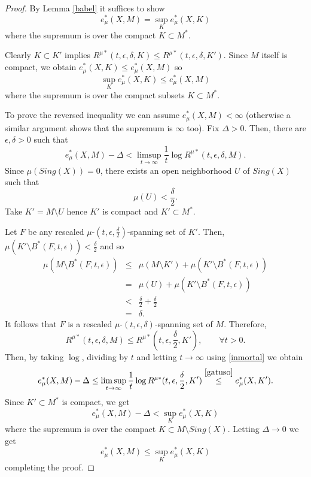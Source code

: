 \documentclass{amsart}
\numberwithin{equation}{section}
\begin{document}
\begin{proof}
By Lemma \ref{babel} it suffices to show
$$
e^*_\mu(X,M)=\sup_Ke^*_\mu(X,K)
$$
where the supremum is over the compact $K\subset M^*$.

Clearly $K\subset K'$ implies $R^{\mu*}(t,\epsilon,\delta,K)\leq
R^{\mu*}(t,\epsilon,\delta,K')$. Since $M$ itself is compact, we obtain
$e^*_\mu(X,K)\leq e^*_\mu(X,M)$ so
$$
\sup_Ke^*_\mu(X,K)\leq e^*_\mu(X,M)
$$
where the supremum is over the compact subsets $K\subset M^*$.

To prove the reversed inequality we can assume $e^*_\mu(X,M)<\infty$
(otherwise a similar argument shows that the supremum is $\infty$ too).
Fix $\Delta>0$. Then, there are $\epsilon,\delta>0$ such that
\begin{equation}
\label{inmortal}
e^*_\mu(X,M)-\Delta<\limsup_{t\to\infty}\frac{1}t\log R^{\mu*}(t,\epsilon,\delta,M).
\end{equation}
Since $\mu(Sing(X))=0$, there exists an open neighborhood $U$ of $Sing(X)$ such that
$$
\mu(U)<\frac{\delta}2.
$$
Take $K'=M\setminus U$ hence $K'$ is compact and $K'\subset M^*$.

Let $F$ be any rescaled $\mu$-$(t,\epsilon,\frac{\delta}2)$-spanning set of $K'$.
Then,
$
\mu(K'\setminus B^*(F,t,\epsilon))<\frac{\delta}2
$
and so
\begin{eqnarray*}
\mu(M\setminus B^*(F,t,\epsilon))&\leq& \mu(M\setminus K')+\mu(K'\setminus B^*(F,t,\epsilon))\\
&=&\mu(U)+\mu(K'\setminus B^*(F,t,\epsilon))\\
&<&\frac{\delta}2+\frac{\delta}2\\
&=& \delta.
\end{eqnarray*}
It follows that $F$ is a rescaled $\mu$-$(t,\epsilon,\delta)$-spanning set of $M$.
Therefore,
$$
R^{\mu*}(t,\epsilon,\delta,M)\leq R^{\mu*}(t,\epsilon,\frac{\delta}2,K'),\quad\quad\forall t>0.
$$
Then, by taking $\log$, dividing by $t$ and letting $t\to\infty$ using \eqref{inmortal} we obtain
$$
e^*_\mu(X,M)-\Delta\leq \limsup_{t\to\infty}\frac{1}t\log R^{\mu*}(t,\epsilon,\frac{\delta}2,K')\overset{\eqref{gatuso}}{\leq} e^*_\mu(X,K').
$$
Since $K'\subset M^*$ is compact, we get
$$
e^*_\mu(X,M)-\Delta<\sup_K e^*_\mu(X,K)
$$
where the supremum is over the compact $K\subset M\setminus  Sing(X)$. Letting $\Delta\to0$ we get
$$
e^*_\mu(X,M)\leq\sup_K e^*_\mu(X,K)
$$
completing the proof.
\end{proof}
\end{document}
